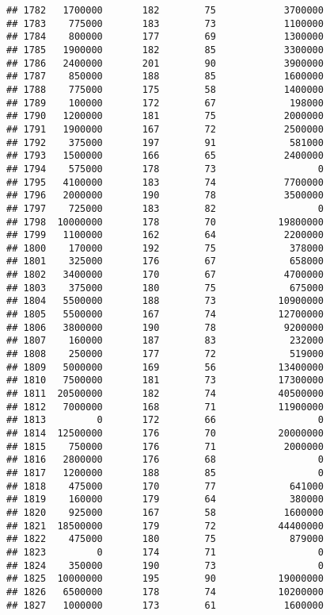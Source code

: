 \documentclass[
]{article}
\begin{document}
\begin{verbatim}
## 1782   1700000       182        75            3700000
## 1783    775000       183        73            1100000
## 1784    800000       177        69            1300000
## 1785   1900000       182        85            3300000
## 1786   2400000       201        90            3900000
## 1787    850000       188        85            1600000
## 1788    775000       175        58            1400000
## 1789    100000       172        67             198000
## 1790   1200000       181        75            2000000
## 1791   1900000       167        72            2500000
## 1792    375000       197        91             581000
## 1793   1500000       166        65            2400000
## 1794    575000       178        73                  0
## 1795   4100000       183        74            7700000
## 1796   2000000       190        78            3500000
## 1797    725000       183        82                  0
## 1798  10000000       178        70           19800000
## 1799   1100000       162        64            2200000
## 1800    170000       192        75             378000
## 1801    325000       176        67             658000
## 1802   3400000       170        67            4700000
## 1803    375000       180        75             675000
## 1804   5500000       188        73           10900000
## 1805   5500000       167        74           12700000
## 1806   3800000       190        78            9200000
## 1807    160000       187        83             232000
## 1808    250000       177        72             519000
## 1809   5000000       169        56           13400000
## 1810   7500000       181        73           17300000
## 1811  20500000       182        74           40500000
## 1812   7000000       168        71           11900000
## 1813         0       172        66                  0
## 1814  12500000       176        70           20000000
## 1815    750000       176        71            2000000
## 1816   2800000       176        68                  0
## 1817   1200000       188        85                  0
## 1818    475000       170        77             641000
## 1819    160000       179        64             380000
## 1820    925000       167        58            1600000
## 1821  18500000       179        72           44400000
## 1822    475000       180        75             879000
## 1823         0       174        71                  0
## 1824    350000       190        73                  0
## 1825  10000000       195        90           19000000
## 1826   6500000       178        74           10200000
## 1827   1000000       173        61            1600000

\end{verbatim}
\end{document}

